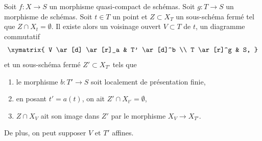 \begin{lemma}
\label{lemma-separate}
Soit $f : X \to S$ un morphisme quasi-compact de schémas.
Soit $g : T \to S$ un morphisme de schémas.
Soit $t \in T$ un point et $Z \subset X_T$ un sous-schéma
fermé tel que $Z \cap X_t = \emptyset$.
Il existe alors un voisinage ouvert
$V \subset T$ de $t$, un diagramme commutatif
$$
\xymatrix{
V \ar[d] \ar[r]_a & T' \ar[d]^b \\
T \ar[r]^g & S,
}
$$
et un sous-schéma fermé $Z' \subset X_{T'}$ tels que
\begin{enumerate}
\item le morphisme $b : T' \to S$ soit localement de présentation finie,
\item en posant $t' = a(t)$, on ait $Z' \cap X_{t'} = \emptyset$,
\item $Z \cap X_V$ ait son image dans $Z'$ par le morphisme $X_V \to X_{T'}$.
\end{enumerate}
De plus, on peut supposer $V$ et $T'$ affines.
\end{lemma}

